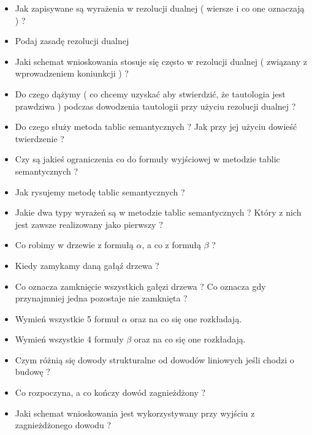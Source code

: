 \documentclass[a4paper,15pt]{article}
\begin{document}
\begin{itemize}
\item Jak zapisywane są wyrażenia w rezolucji dualnej ( wiersze i co one oznaczają ) ?

\item Podaj zasadę rezolucji dualnej

\item Jaki schemat wnioskowania stosuje się często w rezolucji dualnej ( związany z wprowadzeniem koniunkcji ) ?

\item Do czego dążymy ( co chcemy uzyskać aby stwierdzić, że tautologia jest prawdziwa ) podczas dowodzenia tautologii przy użyciu rezolucji dualnej ?

\item Do czego służy metoda tablic semantycznych ? Jak przy jej użyciu dowieść twierdzenie ?

\item Czy są jakieś ograniczenia co do formuły wyjściowej w metodzie tablic semantycznych ?

\item Jak rysujemy metodę tablic semantycznych ?

\item Jakie dwa typy wyrażeń są w metodzie tablic semantycznych ? Który z nich jest zawsze realizowany jako pierwszy ?

\item Co robimy w drzewie z formułą \( \alpha \), a co z formułą \( \beta \) ?

\item Kiedy zamykamy daną gałąź drzewa ?

\item Co oznacza zamknięcie wszystkich gałęzi drzewa ? Co oznacza gdy przynajmniej jedna pozostaje nie zamknięta ?

\item Wymień wszystkie 5 formuł \( \alpha \) oraz na co się one rozkładają.

\item Wymień wszystkie 4 formuły \( \beta \) oraz na co się one rozkładają. 
 
\item Czym różnią się dowody strukturalne od dowodów liniowych jeśli chodzi o budowę ?

\item Co rozpoczyna, a co kończy dowód zagnieżdżony ?

\item Jaki schemat wnioskowania jest wykorzystywany przy wyjściu z zagnieżdżonego dowodu ?


\end{itemize}
\end{document}
